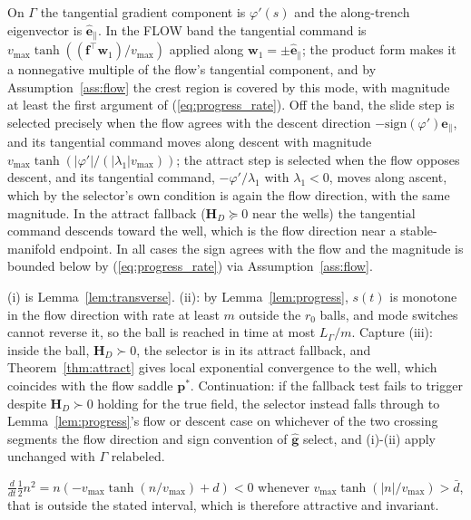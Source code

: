 \documentclass[lettersize,journal]{IEEEtran}
\begin{document}
\begin{IEEEproof}
On $\Gamma$ the tangential gradient component is $\varphi'(s)$ and the
along-trench eigenvector is $\hat{\mathbf{e}}_\parallel$. In the FLOW band
the tangential command is $v_{\max}\tanh((\mathbf{f}^\top
\mathbf{w}_1)/v_{\max})$ applied along $\mathbf{w}_1 = \pm
\hat{\mathbf{e}}_\parallel$; the product form makes it a nonnegative
multiple of the flow's tangential component, and by
Assumption~\ref{ass:flow} the crest region is covered by this mode, with
magnitude at least the first argument of (\ref{eq:progress_rate}). Off
the band, the slide step is selected precisely when the flow agrees with the
descent direction $-\mathrm{sign}(\varphi')\hat{\mathbf{e}}_\parallel$,
and its tangential command moves along descent with magnitude
$v_{\max}\tanh(|\varphi'|/(|\lambda_1| v_{\max}))$; the attract step is selected
when the flow opposes descent, and its tangential command,
$-\varphi'/\lambda_1$ with $\lambda_1 < 0$, moves along ascent, which by
the selector's own condition is again the flow direction, with the same
magnitude. In the attract fallback ($\mathbf{H}_D \succeq 0$ near the
wells) the tangential command descends toward the well, which is the
flow direction near a stable-manifold endpoint. In all cases the sign
agrees with the flow and the magnitude is bounded below by
(\ref{eq:progress_rate}) via Assumption~\ref{ass:flow}.
\end{IEEEproof}

\begin{IEEEproof}
(i) is Lemma~\ref{lem:transverse}. (ii): by Lemma~\ref{lem:progress},
$s(t)$ is monotone in the flow direction with rate at least $m$ outside
the $r_0$ balls, and mode switches cannot reverse it, so the ball is
reached in time at most $L_\Gamma/m$. Capture (iii): inside the ball,
$\mathbf{H}_D \succ 0$, the selector is in its attract fallback, and
Theorem~\ref{thm:attract} gives local exponential convergence to the
well, which coincides with the flow saddle $\mathbf{p}^*$. Continuation:
if the fallback test fails to trigger despite $\mathbf{H}_D \succ 0$
holding for the true field, the selector instead falls through to
Lemma~\ref{lem:progress}'s flow or descent case on whichever of the two
crossing segments the flow direction and sign convention of
$\hat{\mathbf{g}}$ select, and (i)-(ii) apply unchanged with $\Gamma$
relabeled.
\end{IEEEproof}

\begin{IEEEproof}
$\tfrac{d}{dt}\tfrac{1}{2}n^2 = n(-v_{\max}
\tanh(n/v_{\max}) + d) < 0$ whenever $v_{\max}\tanh(|n|/v_{\max}) >
\bar{d}$, that is outside the stated interval, which is therefore
attractive and invariant.
\end{IEEEproof}
\end{document}
